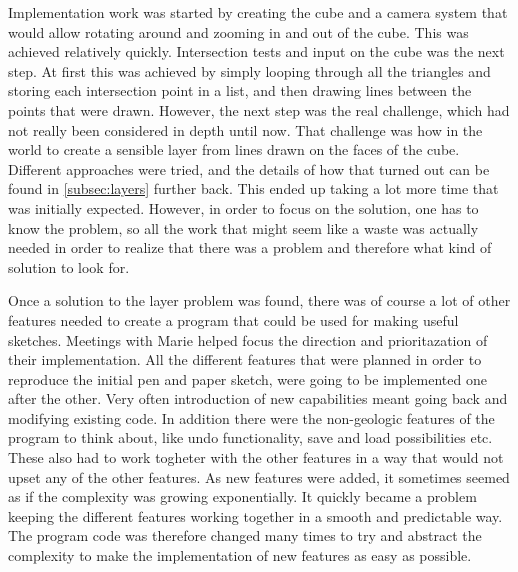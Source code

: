 \documentclass[a4paper,12pt]{report}
\newcommand{\secref}[1]{\autoref{#1}}
\begin{document}
Implementation work was started by creating the cube and a camera system that would allow rotating around and zooming in and out of the cube. This was achieved relatively quickly. Intersection tests and input on the cube was the next step. At first this was achieved by simply looping through all the triangles and storing each intersection point in a list, and then drawing lines between the points that were drawn. However, the next step was the real challenge, which had not really been considered in depth until now. That challenge was how in the world to create a sensible layer from lines drawn on the faces of the cube. Different approaches were tried, and the details of how that turned out can be found in \secref{subsec:layers} further back. This ended up taking a lot more time that was initially expected. However, in order to focus on the solution, one has to know the problem, so all the work that might seem like a waste was actually needed in order to realize that there was a problem and therefore what 
kind of solution to look for.

Once a solution to the layer problem was found, there was of course a lot of other features needed to create a program that could be used for making useful sketches. Meetings with Marie helped focus the direction and prioritazation of their implementation. All the different features that were planned in order to reproduce the initial pen and paper sketch, were going to be implemented one after the other. Very often introduction of new capabilities meant going back and modifying existing code. In addition there were the non-geologic features of the program to think about, like undo functionality, save and load possibilities etc. These also had to work togheter with the other features in a way that would not upset any of the other features. As new features were added, it sometimes seemed as if the complexity was growing exponentially. It quickly became a problem keeping the different features working together in a smooth and predictable way. The program code was therefore changed many times to try and abstract 
the complexity to make the implementation of new features as easy as possible.
\end{document}
